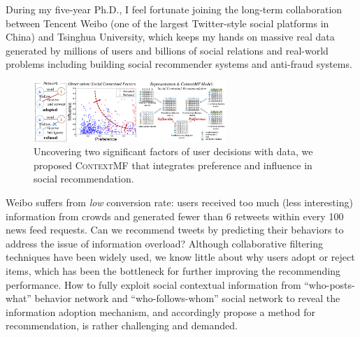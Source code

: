 \documentclass[10.5pt]{article}
\begin{document}
\vskip 0.05in
\vskip 0.01in

During my five-year Ph.D., I feel fortunate joining the long-term collaboration between Tencent Weibo (one of the largest Twitter-style social platforms in China) and Tsinghua University, which keeps my hands on massive real data generated by millions of users and billions of social relations and real-world problems including building social recommender systems and anti-fraud systems. 

\vskip 0.03in


\begin{figure}
\vskip -0.12in
\includegraphics[width=0.65\textwidth]{figure/contextmf.pdf}
\vskip -0.18in
\caption{Uncovering two significant factors of user decisions with data, we proposed \textsc{ContextMF} \cite{jiang2012socialcontextual} that integrates preference and influence in social recommendation.}
\label{fig:contextmf}
\vskip -0.12in
\end{figure}

Weibo suffers from \textit{low} conversion rate: users received too much (less interesting) information from crowds and generated fewer than 6 retweets within every 100 news feed requests. Can we recommend tweets by predicting their behaviors to address the issue of information overload? Although collaborative filtering techniques have been widely used, we know little about why users adopt or reject items, which has been the bottleneck for further improving the recommending performance. How to fully exploit social contextual information from ``who-posts-what'' behavior network and ``who-follows-whom'' social network to reveal the information adoption mechanism, and accordingly propose a method for recommendation, is rather challenging and demanded.
\end{document}
